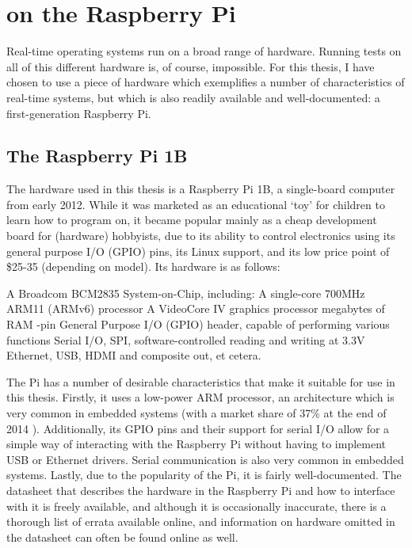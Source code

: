 \chapter{\ucosiii on the Raspberry Pi}
Real-time operating systems run on a broad range of hardware. Running tests on all of this different hardware is, of course, impossible. For this thesis, I have chosen to use a piece of hardware which exemplifies a number of characteristics of real-time systems, but which is also readily available and well-documented: a first-generation Raspberry Pi.

\section{The Raspberry Pi 1B}
The hardware used in this thesis is a Raspberry Pi 1B, a single-board computer from early 2012. While it was marketed as an educational `toy' for children to learn how to program on, it became popular mainly as a cheap development board for (hardware) hobbyists, due to its ability to control electronics using its general purpose I/O (GPIO) pins, its Linux support, and its low price point of \$25-35 (depending on model). Its hardware is as follows:

\begin{outline}
    \1 A Broadcom BCM2835 System-on-Chip, including:
        \2 A single-core 700MHz ARM11 (ARMv6) processor
        \2 A VideoCore IV graphics processor
         megabytes of RAM
    -pin General Purpose I/O (GPIO) header, capable of performing various functions
        \2 Serial I/O, SPI, software-controlled reading and writing at 3.3V
    \1 Ethernet, USB, HDMI and composite out, et cetera.
\end{outline}

\noindent The Pi has a number of desirable characteristics that make it suitable for use in this thesis. Firstly, it uses a low-power ARM processor, an architecture which is very common in embedded systems (with a market share of 37\% at the end of 2014 \cite{arm:embeddedmarketshare}). Additionally, its GPIO pins and their support for serial I/O allow for a simple way of interacting with the Raspberry Pi without having to implement USB or Ethernet drivers. Serial communication is also very common in embedded systems. Lastly, due to the popularity of the Pi, it is fairly well-documented. The datasheet that describes the hardware in the Raspberry Pi and how to interface with it is freely available\cite{bcm:2835peripherals}, and although it is occasionally inaccurate, there is a thorough list of errata available online\cite{bcm:2835errata}, and information on hardware omitted in the datasheet can often be found online as well.

